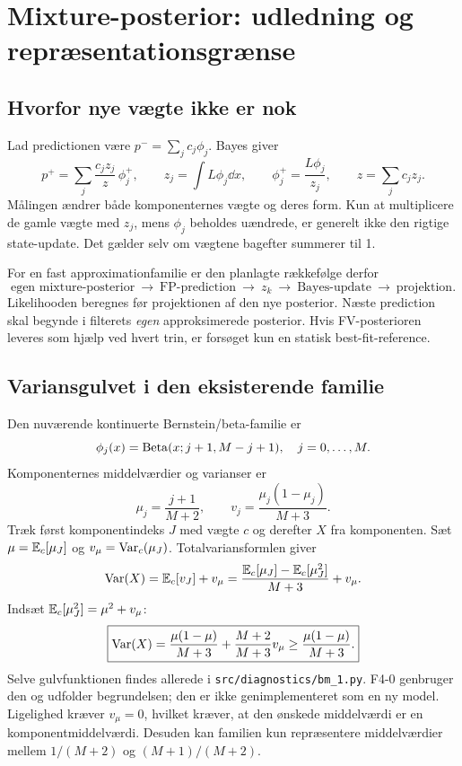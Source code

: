 \section{Mixture-posterior: udledning og repræsentationsgrænse}
\subsection{Hvorfor nye vægte ikke er nok}
Lad predictionen være \(p^-=\sum_jc_j\phi_j\). Bayes giver
\begin{equation}
 p^+=\sum_j\frac{c_jz_j}{z}\,\phi_j^+,
 \qquad z_j=\int L\phi_j\dd x,\qquad
 \phi_j^+=\frac{L\phi_j}{z_j},\qquad z=\sum_jc_jz_j.
 \label{eq:mixturebayes}
\end{equation}
Målingen ændrer både komponenternes vægte og deres form. Kun at multiplicere de gamle vægte med \(z_j\), mens \(\phi_j\) beholdes uændrede, er generelt ikke den rigtige state-update. Det gælder selv om vægtene bagefter summerer til 1.

For en fast approximationfamilie er den planlagte rækkefølge derfor
\[
 \text{egen mixture-posterior}\ \to\ \text{FP-prediction}\ \to\ z_k
 \ \to\ \text{Bayes-update}\ \to\ \text{projektion}.
\]
Likelihooden beregnes før projektionen af den nye posterior. Næste prediction skal begynde i filterets \emph{egen} approksimerede posterior. Hvis FV-posterioren leveres som hjælp ved hvert trin, er forsøget kun en statisk best-fit-reference.

\subsection{Variansgulvet i den eksisterende familie}
Den nuværende kontinuerte Bernstein/beta-familie er
\begin{equation}
 \phi_j(x)=\operatorname{Beta}(x;j+1,M-j+1),\quad j=0,\ldots,M.
 \label{eq:bernstein}
\end{equation}
Komponenternes middelværdier og varianser er
\[
 \mu_j=\frac{j+1}{M+2},\qquad v_j=\frac{\mu_j(1-\mu_j)}{M+3}.
\]
Træk først komponentindeks \(J\) med vægte \(c\) og derefter \(X\) fra komponenten. Sæt \(\mu=\mathbb E_c[\mu_J]\) og \(v_\mu=\operatorname{Var}_c(\mu_J)\). Totalvariansformlen giver
\[
 \operatorname{Var}(X)=\mathbb E_c[v_J]+v_\mu
 =\frac{\mathbb E_c[\mu_J]-\mathbb E_c[\mu_J^2]}{M+3}+v_\mu.
\]
Indsæt \(\mathbb E_c[\mu_J^2]=\mu^2+v_\mu\):
\begin{equation}
 \boxed{\operatorname{Var}(X)=\frac{\mu(1-\mu)}{M+3}
       +\frac{M+2}{M+3}v_\mu
       \geq\frac{\mu(1-\mu)}{M+3}.}
 \label{eq:variancefloor}
\end{equation}
Selve gulvfunktionen findes allerede i \texttt{src/diagnostics/bm\_1.py}. F4-0 genbruger den og udfolder begrundelsen; den er ikke genimplementeret som en ny model. Ligelighed kræver \(v_\mu=0\), hvilket kræver, at den ønskede middelværdi er en komponentmiddelværdi. Desuden kan familien kun repræsentere middelværdier mellem \(1/(M+2)\) og \((M+1)/(M+2)\).

